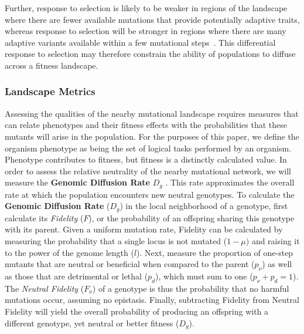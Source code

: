 \documentclass[10pt,letterpaper,final]{article}
\begin{document}
Further, response to selection is likely to be weaker in regions of the landscape where there are fewer available mutations that provide potentially adaptive traits, whereas response to selection will be stronger in regions where there are many adaptive variants available within a few mutational steps~\cite{alberch_genes_1991,carter_role_2005}. This differential response to selection may therefore constrain the ability of populations to diffuse across a fitness landscape.

\subsubsection*{Landscape Metrics}
Assessing the qualities of the nearby mutational landscape requires measures that can relate phenotypes and their fitness effects with the probabilities that these mutants will arise in the population. For the purposes of this paper, we define the organism phenotype as being the set of logical tasks performed by an organism. Phenotype contributes to fitness, but fitness is a distinctly calculated value. In order to assess the relative neutrality of the nearby mutational network, we will measure the \textbf{Genomic Diffusion Rate} $D_g$ \cite{ofria_evolution_2002}. This rate approximates the overall rate at which the population encounters new neutral genotypes.
To calculate the \textbf{Genomic Diffusion Rate} ($D_g$) in the local neighborhood of a genotype, first calculate its \textit{Fidelity} ($F$), or the probability of an offspring sharing this genotype with its parent.  Given a uniform mutation rate, Fidelity
can be calculated by measuring the probability that a single locus is not mutated ($1-\mu)$ and raising it to the power of the genome length ($l$). Next, measure the proportion of one-step mutants that are neutral or beneficial when compared to the parent ($p_\nu$) as well as those that are detrimental or lethal ($p_d$), which must sum to one ($p_\nu + p_d = 1$).  The \textit{Neutral Fidelity} ($F_\nu$) of a genotype is thus the probability that no harmful mutations occur, assuming no epistasis. Finally, subtracting Fidelity from Neutral Fidelity will yield the overall probability of producing an offspring with a different genotype, yet neutral or better fitness ($D_g$).
\end{document}
